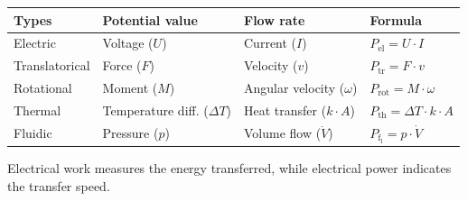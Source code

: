 \begin{frame}
		\begin{table}[H]
			\renewcommand{\tablename}{Table}
			\centering
			\begin{tabular}{|l|l|l|l|} %
				\hline
				\textbf{Types} & \textbf{Potential value} & \textbf{Flow rate} & \textbf{Formula} \\ %
				\hline
				Electric & Voltage ($U$) & Current ($I$) & $P_{\text{el}} = U \cdot I$ \\ %
				\hline
				Translatorical & Force ($F$)  & Velocity ($v$) &  $P_{\text{tr}} = F \cdot v$ \\ %
				\hline
				Rotational & Moment ($M$)  & Angular velocity ($\omega$) & $P_{\text{rot}} = M \cdot \omega$ \\ %
				\hline
				Thermal & Temperature diff. ($\Delta T$) & Heat transfer ($k\cdot A $) & $P_{\text{th}} = \Delta T \cdot k \cdot A$ \\ %
				\hline
				Fluidic & Pressure ($p$) & Volume flow ($\dot{V}$) & $P_\mathrm{f_{l}} = p \cdot \dot{V}$ \\ %
				\hline
			\end{tabular}
			\label{tab:groessen} %
		\end{table}
\end{frame}
\begin{frame}
	\begin{Key point}
		
	Electrical work measures the energy transferred, while electrical power indicates the transfer speed.
	\end{Key point}
\end{frame}
	


	






